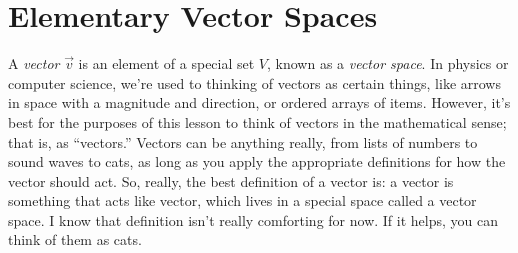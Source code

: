 \chapter{Elementary Vector Spaces}\label{chap:elem_vec_spaces}

A \emph{vector} $\vec{v}$ is an element of a special set $V$, known as a \emph{vector space}. In physics or computer science, we're used to thinking of vectors as certain things, like arrows in space with a magnitude and direction, or ordered arrays of items. However, it's best for the purposes of this lesson to think of vectors in the mathematical sense; that is, as ``vectors.''
Vectors can be anything really, from lists of numbers to sound waves to cats, as long as you apply the appropriate definitions for how the vector should act.
So, really, the best definition of a vector is: a vector is something that acts like vector, which lives in a special space called a vector space. I know that definition isn't really comforting for now. If it helps, you can think of them as cats.
